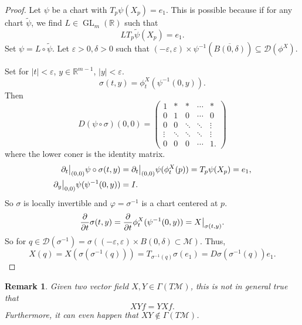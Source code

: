 \documentclass[10pt]{article}
\newtheorem{remark}{Remark}[section]
\DeclareMathOperator{\GL}{GL}
\newcommand{\R}[0]{\mathbb{R}}
\newcommand{\M}[0]{\mathcal{M}}
\newcommand{\pd}[2]{{\frac {\partial #1} {\partial #2}}}
\begin{document}
\begin{proof}
  Let $\psi$ be a chart with $T_p\psi(X_p) = e_1$. This is possible because if for any chart $\tilde{\psi}$, we find $L\in\GL_m(\R)$ such that 
  \begin{equation*}
    LT_p\tilde{\psi}(X_p) = e_1.
  \end{equation*}
  Set $\psi = L\circ\tilde{\psi}$. Let $\varepsilon>0,\delta>0$ such that $(-\varepsilon,\varepsilon)\times \psi^{-1}(\overline{B(0,\delta)})\subseteq\mathcal{D}(\phi^X)$.
  \par Set for $\vert t\vert <\varepsilon$, $y\in\R^{m-1}$, $\vert y\vert <\varepsilon$. 
  \begin{equation*}
    \sigma(t,y) = \phi_t^X(\psi^{-1}(0,y)).
  \end{equation*} 
  Then 
  \begin{equation*}
    D(\psi\circ\sigma)( 0,0) = \begin{pmatrix}
      1 & \ast & \ast & \cdots & \ast\\
      0 & 1 & 0 & \cdots& 0\\
      0 & 0 & \ddots & \ddots & \vdots \\
      \vdots & \ddots & \ddots & \ddots & \vdots\\
      0 & 0 & 0& \cdots & 1.
    \end{pmatrix}
  \end{equation*}
  where the lower coner is the identity matrix.
  \begin{align*}
    \partial_t\big{|}_{(0,0)}\psi\circ\sigma(t,y) & = \partial_t\big{|}_{(0,0)}\psi(\phi_t^X(p)) = T_p\psi(X_p) = e_1,\\
    \partial_y\big{|}_{0,0)}\psi(\psi^{-1}(0,y))&=I.
  \end{align*}
  So $\sigma$ is locally invertible and $\varphi=\sigma^{-1}$ is a chart centered at $p$. 
  \begin{equation*}
    \pd{}{t}\sigma(t,y) = \pd{}{t}\phi^X_t(\psi^{-1}(0,y)) = X\big{|}_{\sigma(t,y)}.
  \end{equation*}
  So for $q\in\mathcal{D}(\sigma^{-1}) = \sigma((-\varepsilon,\varepsilon)\times B(0,\delta)\subset\M)$. Thus,
  \begin{equation*}
    X(q) = X(\sigma(\sigma^{-1}(q))) = T_{\sigma^{-1}(q)}\sigma(e_1) = D\sigma(\sigma^{-1}(q))e_1.
  \end{equation*}
\end{proof}

\begin{remark}
  Given two vector field $X,Y\in\Gamma(T\M)$, this is not in general true that 
  \begin{equation*}
    XY f = YX f.
  \end{equation*}
  Furthermore, it can even happen that $XY\not\in\Gamma(T\M)$.
\end{remark}
\end{document}
